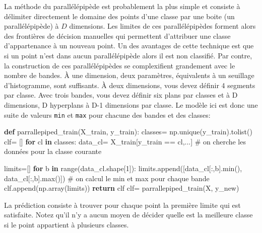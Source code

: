 \documentclass[
  french,
  11pt,
  letterpaper,
  open=any,
  twoside=false,
  french]{scrbook}
\newenvironment{Shaded}{\begin{snugshade}}{\end{snugshade}}
\newcommand{\BuiltInTok}[1]{\textcolor[rgb]{0.00,0.23,0.31}{#1}}
\newcommand{\CommentTok}[1]{\textcolor[rgb]{0.37,0.37,0.37}{#1}}
\newcommand{\ControlFlowTok}[1]{\textcolor[rgb]{0.00,0.23,0.31}{\textbf{#1}}}
\newcommand{\DecValTok}[1]{\textcolor[rgb]{0.68,0.00,0.00}{#1}}
\newcommand{\KeywordTok}[1]{\textcolor[rgb]{0.00,0.23,0.31}{\textbf{#1}}}
\newcommand{\NormalTok}[1]{\textcolor[rgb]{0.00,0.23,0.31}{#1}}
\newcommand{\OperatorTok}[1]{\textcolor[rgb]{0.37,0.37,0.37}{#1}}
\begin{document}
La méthode du parallélépipède est probablement la plus simple et
consiste à délimiter directement le domaine des points d'une classe par
une boite (un parallélépipède) à \(D\) dimensions. Les limites de ces
parallélépipèdes forment alors des frontières de décision manuelles qui
permettent d'attribuer une classe d'appartenance à un nouveau point. Un
des avantages de cette technique est que si un point n'est dans aucun
parallélépipède alors il est non classifié. Par contre, la construction
de ces parallélépipèdes se complexifient grandement avec le nombre de
bandes. À une dimension, deux paramètres, équivalents à un seuillage
d'histogramme, sont suffisants. À deux dimensions, vous devez définir 4
segments par classe. Avec trois bandes, vous devez définir six plans par
classes et à D dimensions, D hyperplans à D-1 dimensions par classe. Le
modèle ici est donc une suite de valeurs \texttt{min} et \texttt{max}
pour chacune des bandes et des classes:

\begin{Shaded}
\begin{Highlighting}[]
\KeywordTok{def}\NormalTok{ parrallepiped\_train(X\_train, y\_train):}
\NormalTok{  classes}\OperatorTok{=}\NormalTok{ np.unique(y\_train).tolist()}
\NormalTok{  clf}\OperatorTok{=}\NormalTok{ []}
  \ControlFlowTok{for}\NormalTok{ cl }\KeywordTok{in}\NormalTok{ classes:}
\NormalTok{      data\_cl}\OperatorTok{=}\NormalTok{ X\_train[y\_train }\OperatorTok{==}\NormalTok{ cl,...] }\CommentTok{\# on cherche les données pour la classe courante}
      
\NormalTok{      limits}\OperatorTok{=}\NormalTok{[]}
      \ControlFlowTok{for}\NormalTok{ b }\KeywordTok{in} \BuiltInTok{range}\NormalTok{(data\_cl.shape[}\DecValTok{1}\NormalTok{]):}
\NormalTok{        limits.append([data\_cl[:,b].}\BuiltInTok{min}\NormalTok{(), data\_cl[:,b].}\BuiltInTok{max}\NormalTok{()]) }\CommentTok{\# on calcul le min et max pour chaque bande}
\NormalTok{      clf.append(np.array(limits))}
  \ControlFlowTok{return}\NormalTok{ clf}
\NormalTok{clf}\OperatorTok{=}\NormalTok{ parrallepiped\_train(X, y\_new)}
\end{Highlighting}
\end{Shaded}

La prédiction consiste à trouver pour chaque point la première limite
qui est satisfaite. Notez qu'il n'y a aucun moyen de décider quelle est
la meilleure classe si le point appartient à plusieurs classes.
\end{document}

